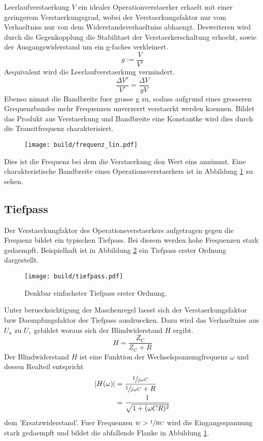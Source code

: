 Leerlaufverstaerkung $V$ ein idealer Operationverstaerker erhaelt mit einer
geringerem Verstaerkungsgrad, wobei der Verstaerkungsfaktor nur vom Verhaeltniss
nur von dem Widerstandsverhaeltniss abhaengt.
Desweiteren wird durch die Gegenkopplung die Stabilitaet der
Verstaerkerschaltung erhoeht, sowie der Ausgangswiderstand um ein g-faches
verkleinert.
\begin{equation}
		g := \frac{V}{V'}
\end{equation}
Aequivalent wird die Leerlaufverstaerkung vermindert.
\begin{equation}
		\frac{\Delta V'}{V'} = \frac{\Delta V}{g V}
\end{equation}
Ebenso nimmt die Bandbreite fuer grosse g zu, sodass aufgrund eines grosseren
Grequenzbandes mehr Frequenzen unverzerrt verstaerkt werden koennen.
Bildet das Produkt aus Verstaerkung und Bandbreite eine Konstantke wird dies
durch die Transitfrequenz charakterisiert.
\begin{figure}[h]
		\centering
		\texttt{[image: build/frequenz\_lin.pdf]}
		\caption{}
		\label{fig:freq}
\end{figure}
Dies ist die Frequenz bei dem die Verstaerkung den Wert eins annimmt.
Eine charakteristische Bandbreite eines Operationsverstaerkers ist in Abbildung
\ref{fig:freq} zu sehen.

\subsection{Tiefpass}%
\label{sub:tiefpass}

Der Verstaerkungfaktor des Operationsverstaerkers aufgetragen gegen die Frequenz bildet ein typischen
Tiefpass.
Bei diesem werden hohe Frequenzen stark gedaempft. 
Beispielhaft ist in Abbildung \ref{fig:tiefpass} ein Tiefpass erster Ordnung
dargestellt.
\begin{figure}[h]
		\centering
		\texttt{[image: build/tiefpass.pdf]}
		\caption{Denkbar einfachster Tiefpass erster Ordnung.}
		\label{fig:tiefpass}
\end{figure}
Unter beruecksichtigung der Maschenregel laesst sich der Verstaerkungsfaktor bzw
Daempfungsfaktor des Tiefpass ausdruecken. 
Dazu wird das Verhaeltniss aus $U_a$ zu $U_e$ gebildet woraus sich der
Blindwiderstand $H$ ergibt.
\begin{equation}
		\label{eq:blindwiederstand}
		H = \frac{Z_\text{C}}{Z_\text{C} + R} 
\end{equation}
Der Blindwiderstand $H$ ist eine Funktion der Wechselspannungfrequenz $\omega$
und dessen Realteil entspricht 
\begin{align}
		\label{eq:h_betrag}
		\left| H(\omega) \right| &= \frac{\sfrac{1}{j \omega C}}{\sfrac{1}{j\omega
		C} + R}  \\
								 &= \frac{1}{\sqrt{1 + (\omega CR)^2}}
\end{align}
dem 'Ersatzwiderstand'.
Fuer Frequenzen $w > \sfrac{1}{RC}$ wird die Eingangsspannung stark gedaempft und bildet
die abfallende Flanke in Abbildung \ref{fig:freq}.

